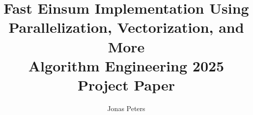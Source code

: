 \documentclass[sigconf]{acmart}
\begin{document}
\title[Fast Einsum Implementation]{Fast Einsum Implementation Using Parallelization, Vectorization, and More\\\large Algorithm Engineering 2025 Project Paper}


\author{Jonas Peters}

\end{document}
